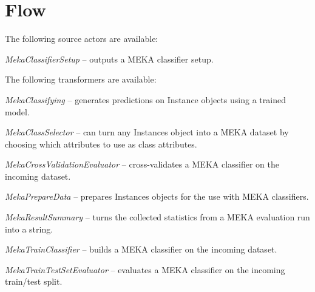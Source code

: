 \documentclass[a4paper]{book}
\begin{document}
\chapter{Flow}
The following source actors are available:
\begin{tight_itemize}
	\item \textit{MekaClassifierSetup} -- outputs a MEKA classifier setup.
\end{tight_itemize}
The following transformers are available:
\begin{tight_itemize}
	\item \textit{MekaClassifying} -- generates predictions on Instance objects
	using a trained model.
	\item \textit{MekaClassSelector} -- can turn any Instances object into
	a MEKA dataset by choosing which attributes to use as class attributes.
	\item \textit{MekaCrossValidationEvaluator} -- cross-validates a MEKA 
	classifier on the incoming dataset.
	\item \textit{MekaPrepareData} -- prepares Instances objects for the 
	use with MEKA classifiers.
	\item \textit{MekaResultSummary} -- turns the collected statistics from
	a MEKA evaluation run into a string.
	\item \textit{MekaTrainClassifier} -- builds a MEKA classifier on the
	incoming dataset.
	\item \textit{MekaTrainTestSetEvaluator} -- evaluates a MEKA classifier
	on the incoming train/test split.
\end{tight_itemize}


\end{document}
